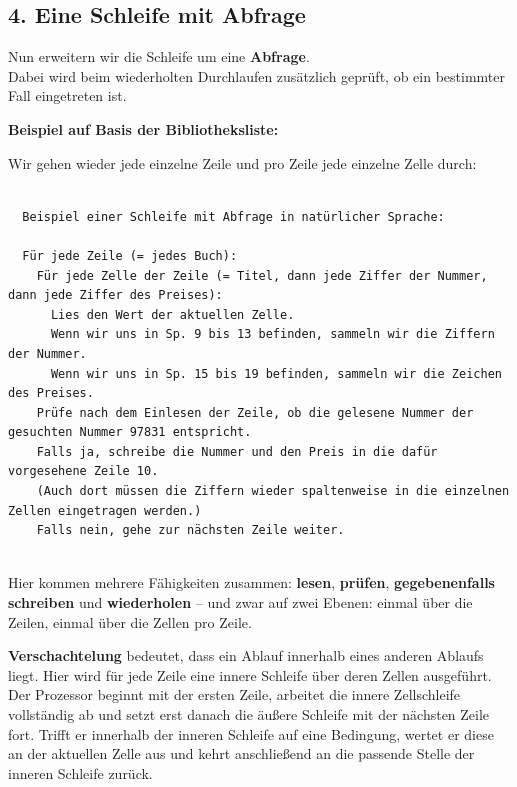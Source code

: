 \documentclass{article}
\begin{document}
        \subsection{4. Eine Schleife mit Abfrage}
        
Nun erweitern wir die Schleife um eine \textbf{Abfrage}.\\
          Dabei wird beim wiederholten Durchlaufen zusätzlich geprüft, ob ein bestimmter Fall eingetreten ist.


        
\textbf{Beispiel auf Basis der Bibliotheksliste:}

        
Wir gehen wieder jede einzelne Zeile und pro Zeile jede einzelne Zelle durch:

        \begin{verbatim}

  Beispiel einer Schleife mit Abfrage in natürlicher Sprache:

  Für jede Zeile (= jedes Buch):
    Für jede Zelle der Zeile (= Titel, dann jede Ziffer der Nummer, dann jede Ziffer des Preises):
      Lies den Wert der aktuellen Zelle.
      Wenn wir uns in Sp. 9 bis 13 befinden, sammeln wir die Ziffern der Nummer.
      Wenn wir uns in Sp. 15 bis 19 befinden, sammeln wir die Zeichen des Preises.
    Prüfe nach dem Einlesen der Zeile, ob die gelesene Nummer der gesuchten Nummer 97831 entspricht.
    Falls ja, schreibe die Nummer und den Preis in die dafür vorgesehene Zeile 10.
    (Auch dort müssen die Ziffern wieder spaltenweise in die einzelnen Zellen eingetragen werden.)
    Falls nein, gehe zur nächsten Zeile weiter.
        
\end{verbatim}

        
Hier kommen mehrere Fähigkeiten zusammen: \textbf{lesen}, \textbf{prüfen}, \textbf{gegebenenfalls schreiben} und \textbf{wiederholen} – und zwar auf zwei Ebenen: einmal über die Zeilen, einmal über die Zellen pro Zeile.

\textbf{Verschachtelung} bedeutet, dass ein Ablauf innerhalb eines anderen Ablaufs liegt. Hier wird für jede Zeile eine innere Schleife über deren Zellen ausgeführt. Der Prozessor beginnt mit der ersten Zeile, arbeitet die innere Zellschleife vollständig ab und setzt erst danach die äußere Schleife mit der nächsten Zeile fort. Trifft er innerhalb der inneren Schleife auf eine Bedingung, wertet er diese an der aktuellen Zelle aus und kehrt anschließend an die passende Stelle der inneren Schleife zurück.
\end{document}
